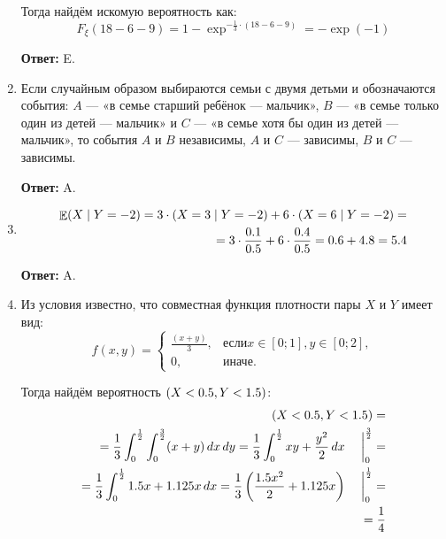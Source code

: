 \documentclass[a4paper]{article} %
\DeclareMathOperator{\E}{\mathbb{E}}
\let\P\relax
\DeclareMathOperator{\P}{\mathbb{P}}
\begin{document}
\begin{enumerate}
    Тогда найдём искомую вероятность как:
    \[
    F_{\xi}(18 - 6 - 9) = 1 - \exp^{-\frac{1}{3} \cdot (18 - 6 - 9)} = -\exp(-1)
    \]
    
    \textbf{Ответ:} E.
    
    
    \item
    Если случайным образом выбираются семьи с двумя детьми и обозначаются события: $A$ — «в семье старший ребёнок — мальчик», $B$ — «в семье только один из детей — мальчик» и $C$ — «в семье хотя бы один из детей — мальчик», то события $A$ и $B$ независимы, $A$ и $C$ — зависимы, $B$ и $C$ — зависимы.
    
    \textbf{Ответ:} A.
    
    
    \item
    \begin{align*}
    \E(X \mid Y = -2) = 3 \cdot \P(X = 3 \mid Y = -2) + 6 \cdot \P(X = 6 \mid Y = -2) = \\
    = 3 \cdot \frac{0.1}{0.5} + 6 \cdot \frac{0.4}{0.5} = 0.6 + 4.8 = 5.4
    \end{align*}
    
    \textbf{Ответ:} A.
    
    
    \item
    Из условия известно, что совместная функция плотности пары $X$ и $Y$ имеет вид:
    \[
    f(x, y) = 
    \begin{cases}
    \frac{(x + y)}{3}, & \text{если} x \in [0; 1], y \in [0; 2], \\
    0, & \text{иначе}.
    \end{cases}
    \]
    
    Тогда найдём вероятность $\P(X < 0.5, Y < 1.5)$:
    \begin{align*}
    \P(X < 0.5, Y < 1.5) = \\ 
    = \frac{1}{3} \int_{0}^{\frac{1}{2}}\int_{0}^{\frac{3}{2}} (x + y) \,dx\,dy = \frac{1}{3} \int_{0}^{\frac{1}{2}} xy + \frac{y^{2}}{2} \,dx \left.\begin{matrix} & \\ & \end{matrix}\right|_{0}^{\frac{3}{2}} = \\
    = \frac{1}{3} \int_{0}^{\frac{1}{2}} 1.5x + 1.125x \,dx = \frac{1}{3}\left(\frac{1.5x^{2}}{2} + 1.125x \right) \left.\begin{matrix} & \\ & \end{matrix}\right|_{0}^{\frac{1}{2}} = \\
    = \frac{1}{4}
    \end{align*}
    

\end{enumerate}
\end{document}
